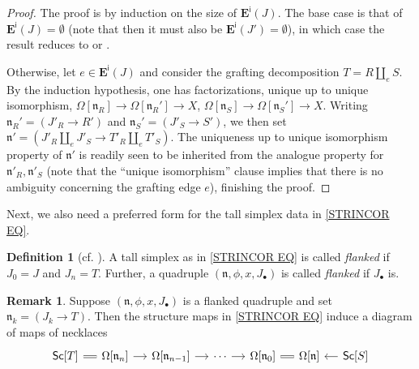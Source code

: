 \documentclass[a4paper,10pt
,draft
]{article}%
\numberwithin{equation}{section}
\numberwithin{figure}{section}
\theoremstyle{definition} %
\newtheorem{definition}[equation]{Definition}%
\newtheorem{remark}[equation]{Remark}%
\newcommand{\1}{\ensuremath{\mathbbm 1}}%
\begin{document}
\begin{proof}
	The proof is by induction on the size of 
	$\boldsymbol{E}^{\mathsf{i}}(J)$.
	The base case is that of $\boldsymbol{E}^{\mathsf{i}}(J) = \emptyset$
	(note that then it must also be $\boldsymbol{E}^{\mathsf{i}}(J') = \emptyset$),
	in which case the result reduces to 
	\cite[Prop. 6.9]{CM11} or
	\cite[Prop. 5.62]{Per18}.

	Otherwise, let $e \in \boldsymbol{E}^{\mathsf{i}}(J)$
	and consider the grafting decomposition
	$T = R \amalg_e S$.
	By the induction hypothesis, 
	one has factorizations, unique up to unique isomorphism,
	$\Omega[\mathfrak{n}_{R}] \to \Omega[\mathfrak{n}_R'] \to X$,
	$\Omega[\mathfrak{n}_S] \to \Omega[\mathfrak{n}_{S}'] \to X$.
	Writing 
	$\mathfrak{n}_R' = (J'_R \to R')$
	and 
	$\mathfrak{n}_S' = (J'_S \to S')$,
	we then set
	$\mathfrak{n}'= \left(
	J'_R \amalg_e J'_S \to T'_R \amalg_e T'_S
	\right)$.
	The uniqueness up to unique isomorphism property of
	$\mathfrak{n}'$ is readily seen to be inherited from 
	the analogue property for 
	$\mathfrak{n}'_R,\mathfrak{n}'_S$
	(note that the ``unique isomorphism'' clause
	implies that there is no ambiguity concerning the grafting edge $e$),
	finishing the proof.
\end{proof}


Next, we also need a preferred form for the tall simplex data in \eqref{STRINCOR EQ}.


\begin{definition}[{cf. \cite[\S 4]{DS11}}]
        \label{FLANKED_DEF}
	A tall simplex as in 
	\eqref{STRINCOR EQ}
	is called \emph{flanked}
	if $J_0 = J$
	and $J_n = T$.
%	
	Further, a quadruple
	$(\mathfrak{n},\phi,x,J_{\bullet})$
	is called \emph{flanked} if $J_{\bullet}$ is.
\end{definition}



\begin{remark}
	Suppose $(\mathfrak{n},\phi,x,J_{\bullet})$
	is a flanked quadruple
	and set $\mathfrak{n}_k = (J_k \to T)$.
	Then the structure maps in \eqref{STRINCOR EQ}
	induce a diagram of maps of necklaces
\begin{equation}
\begin{tikzcd}[column sep=12pt]
	\mathsf{Sc}[T]
	\ar[equal]{r} 
&
	\Omega[\mathfrak{n}_n]
	\ar{r}
&
	\Omega[\mathfrak{n}_{n-1}]
	\ar{r}
&
	\cdots
	\ar{r}
&
	\Omega[\mathfrak{n}_0]
	\ar[equal]{r}
&
	\Omega[\mathfrak{n}]
&
	\mathsf{Sc}[S]
	\ar{l}
\end{tikzcd}
\end{equation} 
\end{remark}
\end{document}
